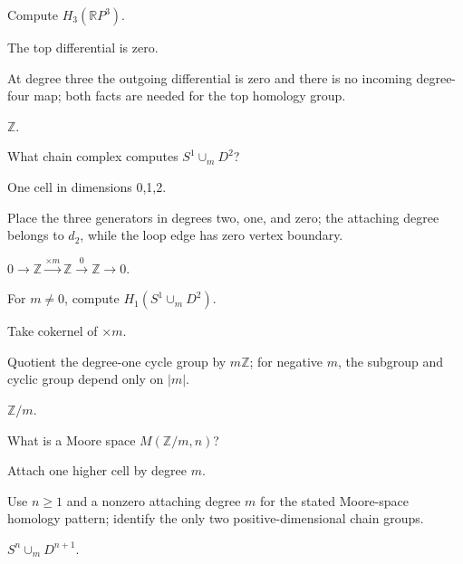 \begin{exercise}\label{exr:viii18-14}
Compute \(H_3(\mathbb RP^3)\).
\end{exercise}
\begin{hint}
The top differential is zero.

At degree three the outgoing differential is zero and there is no incoming degree-four map; both facts are needed for the top homology group.
\end{hint}
\begin{solution}
\(\mathbb Z\).
\end{solution}

\begin{exercise}\label{exr:viii18-15}
What chain complex computes \(S^1\cup_mD^2\)?
\end{exercise}
\begin{hint}
One cell in dimensions 0,1,2.

Place the three generators in degrees two, one, and zero; the attaching degree belongs to \(d_2\), while the loop edge has zero vertex boundary.
\end{hint}
\begin{solution}
\(0\to\mathbb Z\xrightarrow{\times m}\mathbb Z\xrightarrow0\mathbb Z\to0\).
\end{solution}

\begin{exercise}\label{exr:viii18-16}
For \(m\ne0\), compute \(H_1(S^1\cup_mD^2)\).
\end{exercise}
\begin{hint}
Take cokernel of \(\times m\).

Quotient the degree-one cycle group by \(m\mathbb Z\); for negative \(m\), the subgroup and cyclic group depend only on \(|m|\).
\end{hint}
\begin{solution}
\(\mathbb Z/m\).
\end{solution}

\begin{exercise}\label{exr:viii18-17}
What is a Moore space \(M(\mathbb Z/m,n)\)?
\end{exercise}
\begin{hint}
Attach one higher cell by degree \(m\).

Use \(n\ge1\) and a nonzero attaching degree \(m\) for the stated Moore-space homology pattern; identify the only two positive-dimensional chain groups.
\end{hint}
\begin{solution}
\(S^n\cup_mD^{n+1}\).
\end{solution}

